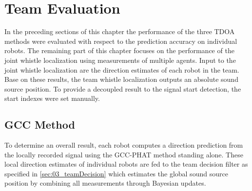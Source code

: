 \section{Team Evaluation}
\label{sec:04_teamEvaluation}


In the preceding sections of this chapter the performance of the three
\ac{TDOA} methods were evaluated with respect to the prediction accuracy on
individual robots.
The remaining part of this chapter focuses on the performance of the joint
whistle localization using measurements of multiple agents. 
Input to the joint whistle localization are the direction estimates of each
robot in the team. Base on these results, the team whistle localization outputs
an absolute sound source position. To provide a decoupled result to the signal
start detection, the start indexes were set manually. 



\subsection{GCC Method}
\label{04_teamGcc}

To determine an overall result, each robot computes a direction prediction from
the locally recorded signal using the \ac{GCC-PHAT} method standing
alone.
These local direction estimates of individual robots are fed to the team
decision filter as specified in \cref{sec:03_teamDecision} which estimates the
global sound source position by combining all measurements through Bayesian
updates.

